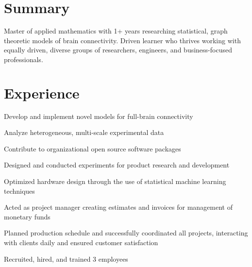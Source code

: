 \documentclass[]{deedy-resume-openfont}
\begin{document}
\hfill
\begin{minipage}[t]{0.63\textwidth}

\section{Summary}
Master of applied mathematics with 1+ years researching statistical, graph theoretic
models of brain connectivity. Driven learner who thrives working with equally
driven, diverse groups of researchers, engineers, and business-focused professionals.
\sectionsep




\section{Experience}
\vspace{\topsep}
\begin{tightemize}
\item {Develop and implement novel models for full-brain connectivity}
\item {Analyze heterogeneous, multi-scale experimental data}
\item {Contribute to organizational open source software packages}
\end{tightemize}
\sectionsep

\begin{tightemize}
\item {Designed and conducted experiments for product research and development}
\item {Optimized hardware design through the use of statistical machine learning techniques}
\end{tightemize}
\sectionsep

\begin{tightemize}
\item {Acted as project manager creating estimates and invoices for management of monetary funds}
\item {Planned production schedule and successfully coordinated all projects, interacting with clients daily and ensured customer satisfaction}
\item {Recruited, hired, and trained 3 employees}
\end{tightemize}
\sectionsep


\end{minipage}
\end{document}
